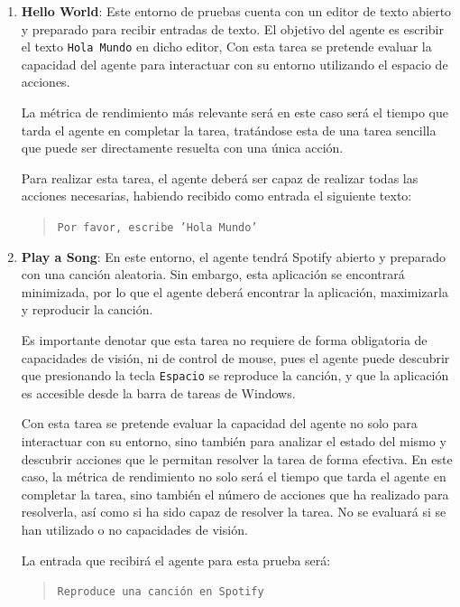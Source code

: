 \begin{enumerate}


  \item \textbf{Hello World}: Este entorno de pruebas cuenta
  con un editor de texto abierto y preparado para recibir entradas de texto.
  El objetivo del agente es escribir el texto \texttt{Hola Mundo} en dicho editor,
  Con esta tarea se pretende evaluar la capacidad del agente para interactuar
  con su entorno utilizando el espacio de acciones. 
  
  La métrica de rendimiento más relevante será en este caso será el tiempo que tarda el agente
  en completar la tarea, tratándose esta de una tarea sencilla que puede
  ser directamente resuelta con una única acción.

  Para realizar esta tarea, el agente deberá ser capaz de realizar todas
  las acciones necesarias, habiendo recibido como entrada el siguiente texto:
  \begin{quote}
    \texttt{Por favor, escribe 'Hola Mundo'}
  \end{quote}

  \item \textbf{Play a Song}: En este entorno, el agente tendrá Spotify
  abierto y preparado con una canción aleatoria. Sin embargo, esta aplicación
  se encontrará minimizada, por lo que el agente deberá encontrar la
  aplicación, maximizarla y reproducir la canción. 
  
  Es importante denotar que esta tarea no requiere de forma obligatoria 
  de capacidades de visión, ni de control de mouse, pues el agente puede descubrir que presionando la 
  tecla \texttt{Espacio} se reproduce la canción, y que la aplicación
  es accesible desde la barra de tareas de Windows.

  Con esta tarea se pretende evaluar la capacidad del agente no solo para 
  interactuar con su entorno, sino también para analizar el estado del mismo 
  y descubrir acciones que le permitan resolver la tarea de forma efectiva.
  En este caso, la métrica de rendimiento no solo será el tiempo que tarda
  el agente en completar la tarea, sino también el número de acciones
  que ha realizado para resolverla, así como si ha sido capaz de resolver
  la tarea. No se evaluará si se han utilizado o no capacidades de visión. 

  La entrada que recibirá el agente para esta prueba será:
  \begin{quote}
    \texttt{Reproduce una canción en Spotify}
  \end{quote}


\end{enumerate}
